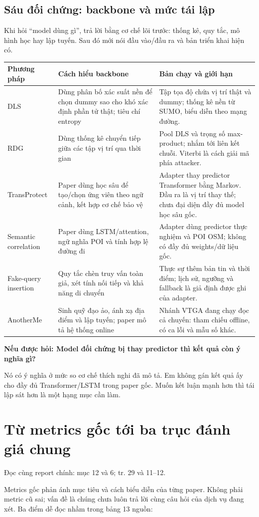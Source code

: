 \documentclass[10pt,a4paper]{article}
\newcommand{\ask}[2]{\par\textbf{Nếu được hỏi: #1}\par #2\par}
\newcommand{\where}[1]{\par{\small\color{gray}Đọc cùng report chính: #1.}\par}
\newcommand{\guidepage}[1]{\clearpage\section{#1}}
\begin{document}
\subsection*{Sáu đối chứng: backbone và mức tái lập}
Khi hỏi ``model dùng gì'', trả lời bằng cơ chế lõi trước: thống kê, quy tắc, mô hình học hay lập tuyến. Sau đó mới nói đầu vào/đầu ra và bản triển khai hiện có.
\begin{longtable}{@{}P{2.7cm}P{6.4cm}P{7.1cm}@{}}
\toprule Phương pháp & Cách hiểu backbone & Bản chạy và giới hạn\\\midrule
DLS & Dùng phân bố xác suất nền để chọn dummy sao cho khó xác định phần tử thật; tiêu chí entropy & Tập tọa độ chứa vị trí thật và dummy; thống kê nền từ SUMO, biểu diễn theo mạng đường.\\[5pt]
RDG & Dùng thống kê chuyển tiếp giữa các tập vị trí qua thời gian & Pool DLS và trọng số max-product; nhắm tới liên kết chuỗi. Viterbi là cách giải mã phía attacker.\\[5pt]
TransProtect & Paper dùng học sâu để tạo/chọn ứng viên theo ngữ cảnh, kết hợp cơ chế bảo vệ & Adapter thay predictor Transformer bằng Markov. Đầu ra là vị trí thay thế; chưa đại diện đầy đủ model học sâu gốc.\\[5pt]
Semantic correlation & Paper dùng LSTM/attention, ngữ nghĩa POI và tính hợp lệ đường đi & Adapter dùng predictor thực nghiệm và POI OSM; không có đầy đủ weights/dữ liệu gốc.\\[5pt]
Fake-query insertion & Quy tắc chèn truy vấn toàn giả, xét tính nối tiếp và khả năng di chuyển & Thực sự thêm bản tin và thời điểm; lịch sử, ngưỡng và fallback là giả định được ghi của adapter.\\[5pt]
AnotherMe & Sinh quỹ đạo ảo, ánh xạ địa điểm và lập tuyến; paper mô tả hệ thống online & Nhánh VTGA đang chạy đọc cả chuyến: tham chiếu offline, có ca lỗi và mẫu số khác.\\
\bottomrule
\end{longtable}

\ask{Model đối chứng bị thay predictor thì kết quả còn ý nghĩa gì?}{Nó có ý nghĩa ở mức so cơ chế thích nghi đã mô tả. Em không gán kết quả ấy cho đầy đủ Transformer/LSTM trong paper gốc. Muốn kết luận mạnh hơn thì tái lập sát hơn là một hạng mục cần làm.}

\guidepage{Từ metrics gốc tới ba trục đánh giá chung}
\where{mục 12 và 6; tr. 29 và 11--12}
Metrics gốc phản ánh mục tiêu và cách biểu diễn của từng paper. Không phải metric cũ sai; vấn đề là chúng chưa luôn trả lời cùng câu hỏi của dịch vụ đang xét. Ba điểm dễ đọc nhầm trong bảng 13 nguồn:
\end{document}
